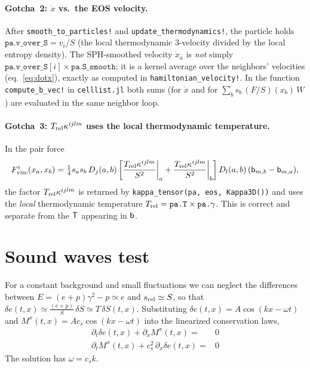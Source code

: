 \documentclass[12pt,aps,preprint,nofootinbib,noshowkeys,noshowpacs,longbibliography,superscriptaddress,tightenlines]{revtex4-2}
\def\bbeta{{\sf b}}
\def\Teff{{\sf T}}
\begin{document}
\paragraph{Gotcha~2: $\dot x$ vs.\ the EOS velocity.}
After \texttt{smooth\_to\_particles!} and \texttt{update\_thermodynamics!},
the particle holds $\texttt{pa.v\_over\_S} = v_i/S$ (the local
thermodynamic 3-velocity divided by the local entropy density).
The SPH-smoothed velocity $\dot x_a$ is \emph{not} simply
$\texttt{pa.v\_over\_S}[i] \times \texttt{pa.S\_smooth}$; it is a kernel
average over the neighbors' velocities (eq.~\eqref{eq:dotx}), exactly as computed
in \texttt{hamiltonian\_velocity!}.  In the function \texttt{compute\_b\_vec!}
in \texttt{celllist.jl} both sums (for $\dot x$ and for
$\sum_b s_b\,(F/S)(x_b)\,W$) are evaluated in the same neighbor loop.

\paragraph{Gotcha~3: $T_{\rm rel}\kappa^{ijlm}$ uses the local thermodynamic temperature.}
In the pair force
\begin{equation}
    F^i_{\rm visc}(x_a,x_b) =
    \tfrac{1}{4}s_a s_b\,D_j(a,b)
    \left[\frac{T_{\rm rel}\kappa^{ijlm}}{S^2}\bigg|_a +
          \frac{T_{\rm rel}\kappa^{ijlm}}{S^2}\bigg|_b\right]
    D_l(a,b)\,(\bbeta_{m,b}-\bbeta_{m,a}),
\end{equation}
the factor $T_{\rm rel}\kappa^{ijlm}$ is returned by \texttt{kappa\_tensor(pa, eos, Kappa3D())}
and uses the \emph{local} thermodynamic temperature
$T_{\rm rel} = \texttt{pa.T}\times\texttt{pa.}\gamma$.  This is correct and separate
from the $\Teff$ appearing in $\bbeta$.

\section{Sound waves test}

For a constant background and small fluctuations we can neglect the differences between
$E = (e + p) \gamma^2 - p \simeq e$ and $s_{\rm rel} \simeq S$, so that
$\delta e(t, x) \simeq \frac{(e + p)}{S}\,\delta S \simeq T\,\delta S(t, x)$.
Substituting $\delta e(t, x) = A \cos(kx - \omega t)$ and $M^x(t, x) = A c_s \cos(kx - \omega t)$
into the linearized conservation laws,
\begin{align}
  \partial_t \delta e(t,x) +  \partial_x M^x(t, x) =& 0 \\
  \partial_t M^x(t, x) +  c_s^2\, \partial_x \delta e(t, x) =& 0
\end{align}
The solution has $\omega = c_s k$. 
\end{document}
